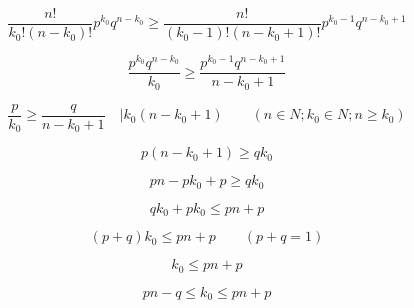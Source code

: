 \documentclass{report}
\begin{document}
\begin{displaymath}
\frac{n!}{k_0!(n-k_0)!}p^{k_0}q^{n-k_0} \geq \frac{n!}{(k_0 - 1)!(n - k_0 + 1)!}p^{k_0-1}q^{n-k_0+1}
\end{displaymath}

\begin{displaymath}
\frac{p^{k_0}q^{n-k_0}}{k_0} \geq \frac{p^{k_0-1}q^{n-k_0+1}}{n - k_0 + 1}
\end{displaymath}

\begin{displaymath}
\frac{p}{k_0} \geq \frac{q}{n - k_0 + 1}
\quad | k_0(n - k_0 + 1) \qquad (n \in N; k_0 \in N; n \geq k_0)
\end{displaymath}

\begin{displaymath}
p(n - k_0 + 1) \geq qk_0
\end{displaymath}

\begin{displaymath}
pn - pk_0 + p \geq qk_0
\end{displaymath}

\begin{displaymath}
qk_0 + pk_0 \leq pn + p
\end{displaymath}

\begin{displaymath}
(p + q) k_0 \leq pn + p \qquad (p + q = 1)
\end{displaymath}

\begin{displaymath}
k_0 \leq pn + p
\end{displaymath}

\noindent\makebox[\linewidth]{\rule{\paperwidth}{0.4pt}}

\begin{displaymath}
pn - q \leq k_0 \leq pn + p
\end{displaymath}
\end{document}
